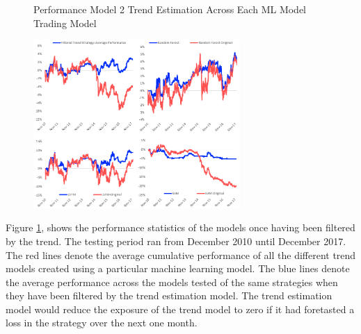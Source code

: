 \documentclass[11pt]{article}
\begin{document}
\begin{figure}[h]
    \centering
	\caption{Performance Model 2 Trend Estimation Across Each ML Model Trading Model}    
	\includegraphics[width=0.7\textwidth]{TrendFilteredResults}
    \label{fig:TrendFilteredResults}
     \caption*{}
\end{figure}

Figure \ref{fig:TrendFilteredResults}, shows the performance statistics of the models once having been filtered by the trend. The testing period ran from December 2010 until December 2017. The red lines denote the average cumulative performance of all the different trend models created using a particular machine learning model. The blue lines denote the average performance across the models tested of the same strategies when they have been filtered by the trend estimation model. The trend estimation model would reduce the exposure of the trend model to zero if it had foretasted a loss in the strategy over the next one month.  
\end{document}
